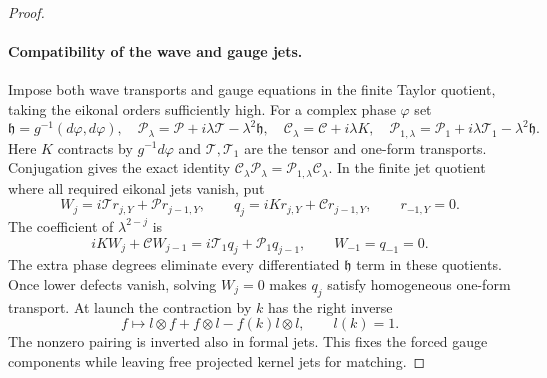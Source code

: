 \begin{proof}
\paragraph{Compatibility of the wave and gauge jets.}
Impose both wave transports and gauge equations in the finite
Taylor quotient, taking the eikonal orders sufficiently high.
For a complex phase $\varphi$ set
\[
 \mathfrak h=g^{-1}(d\varphi,d\varphi),\quad
 \mathcal P_\lambda=\mathcal P+i\lambda\mathcal T-\lambda^2\mathfrak h,
 \quad\mathcal C_\lambda=\mathcal C+i\lambda K,
 \quad\mathcal P_{1,\lambda}=\mathcal P_1+i\lambda\mathcal T_1-\lambda^2\mathfrak h.
\]
Here $K$ contracts by $g^{-1}d\varphi$ and $\mathcal T,\mathcal T_1$
are the tensor and one-form transports. Conjugation gives the exact
identity $\mathcal C_\lambda\mathcal P_\lambda
=\mathcal P_{1,\lambda}\mathcal C_\lambda$. In the finite jet quotient
where all required eikonal jets vanish, put
\[
 W_j=i\mathcal T r_{j,Y}+\mathcal P r_{j-1,Y},\qquad
 q_j=iKr_{j,Y}+\mathcal C r_{j-1,Y},\qquad r_{-1,Y}=0.
\]
The coefficient of $\lambda^{2-j}$ is
\begin{equation}\label{pk2:beam-defect-identity}
 iKW_j+\mathcal C W_{j-1}=i\mathcal T_1q_j+\mathcal P_1q_{j-1},
 \qquad W_{-1}=q_{-1}=0.
\end{equation}
The extra phase degrees eliminate every differentiated $\mathfrak h$
term in these quotients. Once lower defects vanish, solving $W_j=0$
makes $q_j$ satisfy homogeneous one-form transport.
At launch the contraction by $k$ has the right inverse
\[
 f\longmapsto l\otimes f+f\otimes l-f(k)l\otimes l,
 \qquad l(k)=1.
\]
The nonzero pairing is inverted also in formal jets. This fixes
the forced gauge components while leaving free projected kernel
jets for matching.


\end{proof}
